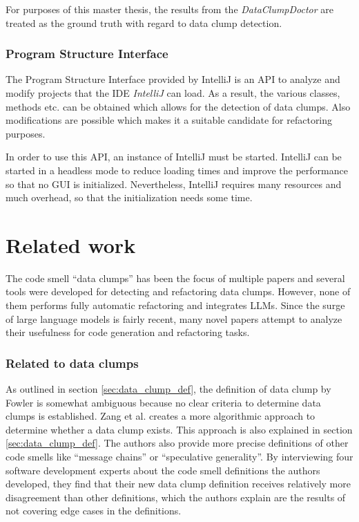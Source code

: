 For purposes of this master thesis, the results from the \textit{DataClumpDoctor} are treated as the ground truth with regard to data clump detection. 

\subsubsection{ Program Structure Interface}\label{sec:psi}
The Program Structure Interface provided by IntelliJ is an \ac{API} to analyze and modify  projects that the \ac{IDE} \textit{IntelliJ} can load. As a result, the various classes, methods etc. can be obtained which allows for the detection of data clumps. Also modifications are possible which makes it a suitable candidate for refactoring purposes.

In order to use this API, an instance of IntelliJ must be started. IntelliJ can be started in a headless mode to reduce loading times and improve the performance so that no GUI is initialized. Nevertheless, IntelliJ requires many resources and much overhead, so that  the initialization needs some time.


\section{Related work}\label{sec:related_research}


The code smell \enquote{data clumps} has been the focus of multiple papers and several tools were developed for detecting and refactoring data clumps. However, none of them performs fully automatic refactoring and integrates \acp{LLM}.
Since the surge of large language models is fairly recent, many novel papers attempt to analyze their usefulness for code generation and refactoring tasks.

\subsubsection{Related to data clumps}

As outlined in section \ref{sec:data_clump_def}, the definition of data clump by Fowler \cite{fowler2019refactoring} is somewhat ambiguous because no clear criteria to determine data clumps is established. Zang et al. \cite{zhangImprovingPrecisionFowler2008} creates a more algorithmic approach to determine whether a data clump exists. This approach is also explained in section \ref{sec:data_clump_def}. The authors also provide more precise definitions of other code smells like \enquote{message chains} or \enquote{speculative generality}. By interviewing four software development experts about the code smell definitions the authors developed, they find that their new data clump definition receives relatively more disagreement than other definitions, which the authors explain are the results of not covering edge cases in the definitions. 


